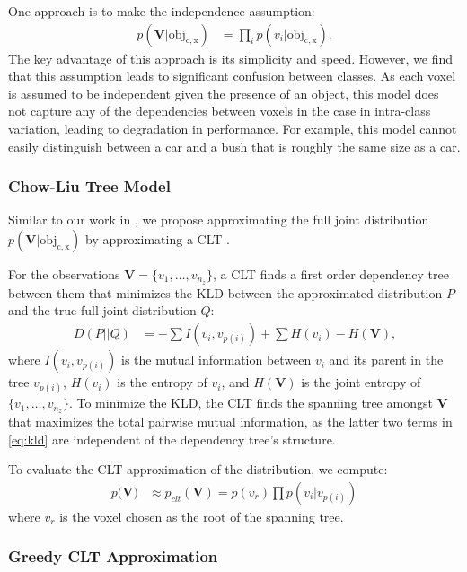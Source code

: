 One approach is to make the independence assumption:
%
\begin{align}
  p(\mathbf{V} | \mathrm{obj_{c, x}}) &= \prod_i p(v_i | \mathrm{obj_{c, x}})
  \text{.}
\end{align}
%
The key advantage of this approach is its simplicity and speed.
However, we find that this assumption leads to significant confusion between
classes. As each voxel is assumed to be independent given the presence of an
object, this model does not capture any of the dependencies between voxels in
the case in intra-class variation, leading to degradation in performance. For
example, this model cannot easily distinguish between a car and a bush that is
roughly the same size as a car.

\subsubsection{Chow-Liu Tree Model} \label{sec:clt}

Similar to our work in \cite{ushani_raybased}, we propose approximating the full
joint distribution $p(\mathbf{V} | \mathrm{obj_{c,x}})$ by approximating a
\ac{CLT} \citep{chow1968approximating}.

For the observations $\mathbf{V} = \{v_1, \ldots, v_{n_z}\}$, a \ac{CLT} finds a
first order dependency tree between them that minimizes the \ac{KLD} between the
approximated distribution $P$ and the true full joint distribution $Q$:
%
\begin{align}
  D(P || Q) &= -\sum I(v_i, v_{p(i)}) + \sum H(v_i) - H(\mathbf{V})
  \label{eq:kld}
  \text{,}
\end{align}
%
where $I(v_i, v_{p(i)})$ is the mutual information between $v_i$ and its parent
in the tree $v_{p(i)}$, $H(v_i)$ is the entropy of $v_i$, and $H(\mathbf{V})$ is
the joint entropy of $\{v_1, \ldots, v_{n_z}\}$. To minimize the \ac{KLD}, the
\ac{CLT} finds the spanning tree amongst $\mathbf{V}$ that maximizes the total
pairwise mutual information, as the latter two terms in \eqref{eq:kld} are
independent of the dependency tree's structure.

To evaluate the \ac{CLT} approximation of the distribution, we compute:
%
\begin{align}
  p(\mathbf{V)} &\approx p_{clt}(\mathbf{V}) = p(v_r) \prod p(v_i | v_{p(i)})
\end{align}
%
where $v_r$ is the voxel chosen as the root of the spanning tree.

\subsubsection{Greedy CLT Approximation} \label{sec:greedy_clt}

